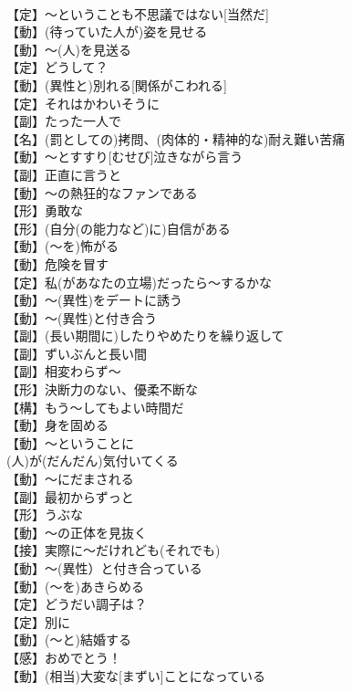 \documentclass[8pt]{extreport}
\begin{document}
\begin{CJK}{UTF8}{min}
\\	【定】～ということも不思議ではない[当然だ]
\\	【動】(待っていた人が)姿を見せる
\\	【動】～(人)を見送る
\\	【定】どうして？
\\	【動】(異性と)別れる[関係がこわれる]
\\	【定】それはかわいそうに
\\	【副】たった一人で
\\	【名】(罰としての)拷問、(肉体的・精神的な)耐え難い苦痛
\\	【動】～とすすり[むせび]泣きながら言う
\\	【副】正直に言うと
\\	【動】～の熱狂的なファンである
\\	【形】勇敢な
\\	【形】(自分(の能力など)に)自信がある
\\	【動】(～を)怖がる
\\	【動】危険を冒す
\\	【定】私(があなたの立場)だったら～するかな
\\	【動】～(異性)をデートに誘う
\\	【動】～(異性)と付き合う
\\	【副】(長い期間に)したりやめたりを繰り返して
\\	【副】ずいぶんと長い間
\\	【副】相変わらず～
\\	【形】決断力のない、優柔不断な
\\	【構】もう～してもよい時間だ
\\	【動】身を固める
\\	【動】～ということに
\\	(人)が(だんだん)気付いてくる
\\	【動】～にだまされる
\\	【副】最初からずっと
\\	【形】うぶな
\\	【動】～の正体を見抜く
\\	【接】実際に～だけれども(それでも)
\\	【動】～(異性）と付き合っている
\\	【動】(～を)あきらめる
\\	【定】どうだい調子は？
\\	【定】別に
\\	【動】(～と)結婚する
\\	【感】おめでとう！
\\	【動】(相当)大変な[まずい]ことになっている

\end{CJK}
\end{document}
